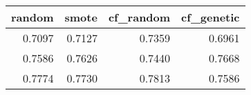 \begin{tabular}{rrrr}
\toprule
 random &  smote &  cf\_random &  cf\_genetic \\
\midrule
 0.7097 & 0.7127 &     0.7359 &      0.6961 \\
 0.7586 & 0.7626 &     0.7440 &      0.7668 \\
 0.7774 & 0.7730 &     0.7813 &      0.7586 \\
\bottomrule
\end{tabular}
